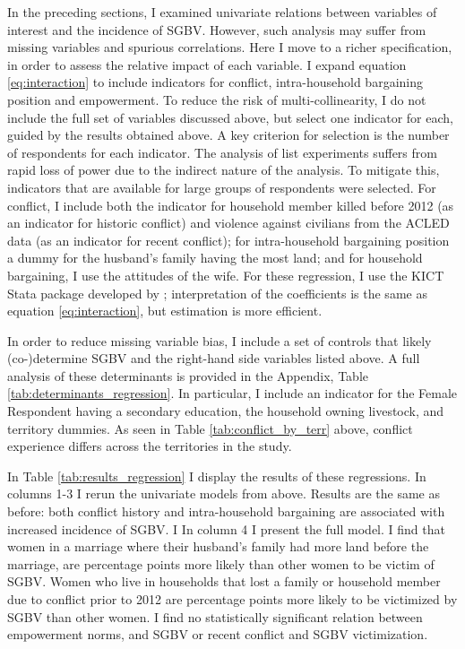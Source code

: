 \documentclass[10pt,a4paper,abstract=on]{scrartcl} %
\begin{document}
In the preceding sections, I examined univariate relations between variables of interest and the incidence of SGBV. However, such analysis may suffer from missing variables and spurious correlations. Here I move to a richer specification, in order to assess the relative impact of each variable. I expand equation \ref{eq:interaction} to include indicators for conflict, intra-household bargaining position and empowerment. To reduce the risk of multi-collinearity, I do not include the full set of variables discussed above, but select one indicator for each, guided by the results obtained above. A key criterion for selection is the number of respondents for each indicator. The analysis of list experiments suffers from rapid loss of power due to the indirect nature of the analysis. To mitigate this, indicators that are available for large groups of respondents were selected. For conflict, I include both the indicator for household member killed before 2012 (as an indicator for historic conflict) and violence against civilians from the ACLED data (as an indicator for recent conflict); for intra-household bargaining position a dummy for the husband's family having the most land; and for household bargaining, I use the attitudes of the wife. For these regression, I use the KICT Stata package developed by \citet{Tsai2019}; interpretation of the coefficients is the same as equation \ref{eq:interaction}, but estimation is more efficient.

In order to reduce missing variable bias, I include a set of controls that likely (co-)determine SGBV and the right-hand side variables listed above. A full analysis of these determinants is provided in the Appendix, Table \ref{tab:determinants_regression}. In particular, I include an indicator for the Female Respondent having a secondary education, the household owning livestock, and territory dummies. As seen in Table \ref{tab:conflict_by_terr} above, conflict experience differs across the territories in the study. 

In Table \ref{tab:results_regression} I display the results of these regressions. In columns 1-3 I rerun the univariate models from above. Results are the same as before: both conflict history and intra-household bargaining are associated with increased incidence of SGBV. I In column 4 I present the full model. I find that women in a marriage where their husband's family had more land before the marriage, are  percentage points more likely than other women to be victim of SGBV. Women who live in households that lost a family or household member due to conflict prior to 2012 are  percentage points more likely to be victimized by SGBV than other women. I find no statistically significant relation between empowerment norms, and SGBV or recent conflict and SGBV victimization.
\end{document}

